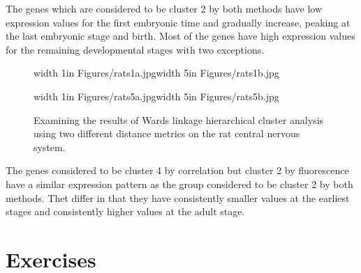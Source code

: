 \documentclass{article}
\begin{document}
The genes which are considered to be cluster 2 by both methods have
low expression values for the first embryonic time and gradually
increase, peaking at the last embryonic stage and birth. Most of the
genes have high expression values for the remaining developmental
stages with two exceptions. 

\begin{figure*}[htbp]
\centerline{{\pdfimage width 1in {Figures/rats1a.jpg}}{\pdfimage width 5in {Figures/rats1b.jpg}}}
\centerline{{\pdfimage width 1in {Figures/rats5a.jpg}}{\pdfimage width 5in {Figures/rats5b.jpg}}}
\caption{Examining the results of Wards linkage hierarchical cluster analysis
using two different distance metrics on the rat central nervous system.}
\label{rats1}
\end{figure*}

The genes considered to be cluster 4 by correlation but cluster 2 by
fluorescence have a similar expression pattern as the group considered
to be cluster 2 by both methods. Thet differ in that they have
consistently smaller values at the earliest stages and consistently
higher values at the adult stage.




\section{Exercises}
\end{document}
